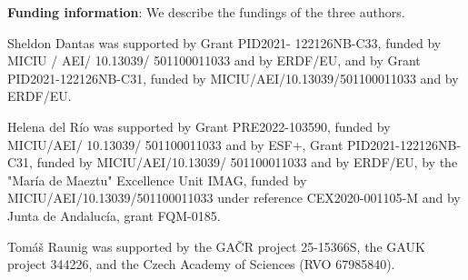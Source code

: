 \documentclass[a4paper,12pt]{amsart}
\theoremstyle{definition}
\theoremstyle{definition}
\theoremstyle{remark}
\numberwithin{equation}{section}
\newcommand{\<}{\langle}
\renewcommand{\>}{\rangle}
\begin{document}
	
	
	
	\textbf{Funding information}: We describe the fundings of the three authors.
	
	Sheldon Dantas was supported by Grant PID2021- 122126NB-C33, funded by MICIU / AEI/ 10.13039/ 501100011033 and by ERDF/EU, and by Grant PID2021-122126NB-C31, funded by MICIU/AEI/10.13039/501100011033 and by ERDF/EU. 
	
	Helena del Río was supported by Grant PRE2022-103590, funded by MICIU/AEI/ 10.13039/ 501100011033 and by ESF+, Grant PID2021-122126NB-C31, funded by MICIU/AEI/10.13039/ 501100011033 and by ERDF/EU, by the "María de Maeztu" Excellence Unit IMAG, funded by MICIU/AEI/10.13039/501100011033 under reference CEX2020-001105-M and by Junta de Andaluc\'ia, grant FQM-0185. 
	
	Tomáš Raunig was supported by the GAČR project 25-15366S, the GAUK project 344226, and the Czech Academy of Sciences (RVO 67985840).
	
	
	
	
	
	
\end{document}
